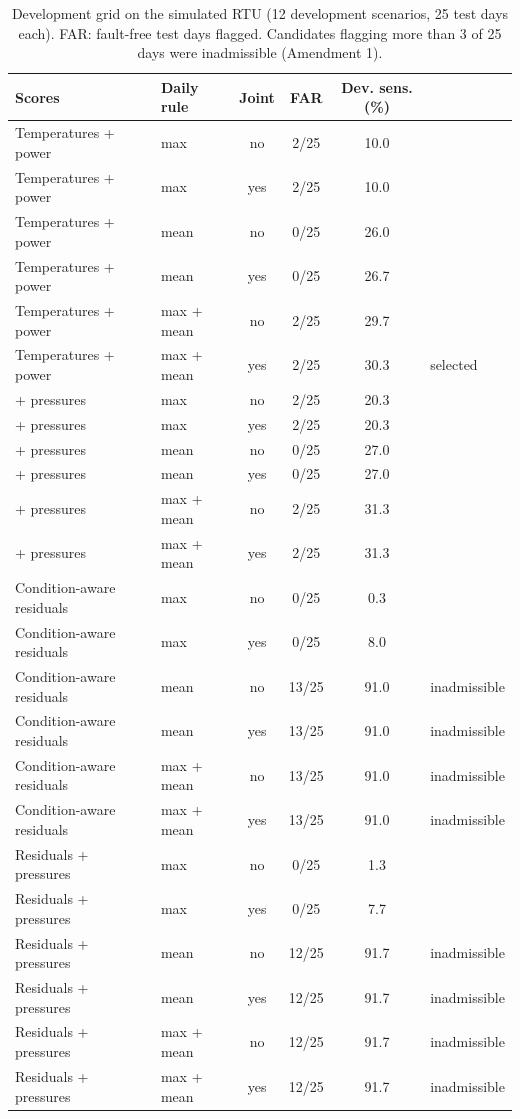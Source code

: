 \begin{table}[h!]\centering\footnotesize\caption{Development grid on the simulated RTU (12 development scenarios, 25 test days each). FAR: fault-free test days flagged. Candidates flagging more than 3 of 25 days were inadmissible (Amendment 1).}\label{tab:S1}
\begin{tabular}{llcccl}\toprule
Scores & Daily rule & Joint & FAR & Dev. sens. (\%) & \\\midrule
Temperatures + power & max & no & 2/25 & 10.0 & \\
Temperatures + power & max & yes & 2/25 & 10.0 & \\
Temperatures + power & mean & no & 0/25 & 26.0 & \\
Temperatures + power & mean & yes & 0/25 & 26.7 & \\
Temperatures + power & max + mean & no & 2/25 & 29.7 & \\
Temperatures + power & max + mean & yes & 2/25 & 30.3 & selected\\
+ pressures & max & no & 2/25 & 20.3 & \\
+ pressures & max & yes & 2/25 & 20.3 & \\
+ pressures & mean & no & 0/25 & 27.0 & \\
+ pressures & mean & yes & 0/25 & 27.0 & \\
+ pressures & max + mean & no & 2/25 & 31.3 & \\
+ pressures & max + mean & yes & 2/25 & 31.3 & \\
Condition-aware residuals & max & no & 0/25 & 0.3 & \\
Condition-aware residuals & max & yes & 0/25 & 8.0 & \\
Condition-aware residuals & mean & no & 13/25 & 91.0 & inadmissible\\
Condition-aware residuals & mean & yes & 13/25 & 91.0 & inadmissible\\
Condition-aware residuals & max + mean & no & 13/25 & 91.0 & inadmissible\\
Condition-aware residuals & max + mean & yes & 13/25 & 91.0 & inadmissible\\
Residuals + pressures & max & no & 0/25 & 1.3 & \\
Residuals + pressures & max & yes & 0/25 & 7.7 & \\
Residuals + pressures & mean & no & 12/25 & 91.7 & inadmissible\\
Residuals + pressures & mean & yes & 12/25 & 91.7 & inadmissible\\
Residuals + pressures & max + mean & no & 12/25 & 91.7 & inadmissible\\
Residuals + pressures & max + mean & yes & 12/25 & 91.7 & inadmissible\\
\bottomrule\end{tabular}\end{table}


